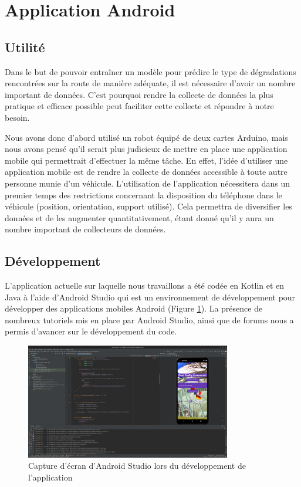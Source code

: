 \section{Application Android}

\subsection{Utilité}
Dans le but de pouvoir entraîner un modèle pour prédire le type de dégradations rencontrées sur la route de manière adéquate, il est nécessaire d'avoir un nombre important de données. C'est pourquoi rendre la collecte de données la plus pratique et efficace possible peut faciliter cette collecte et répondre à notre besoin.

Nous avons donc d'abord utilisé un robot équipé de deux cartes Arduino, mais nous avons pensé qu'il serait plus judicieux de mettre en place une application mobile qui permettrait d'effectuer la même tâche. En effet, l'idée d'utiliser une application mobile est de rendre la collecte de données accessible à toute autre personne munie d'un véhicule. L'utilisation de l'application nécessitera dans un premier temps des restrictions concernant la disposition du téléphone dans le véhicule (position, orientation, support utilisé). Cela permettra de diversifier les données et de les augmenter quantitativement, étant donné qu'il y aura un nombre important de collecteurs de données.

\subsection{Développement}
L'application actuelle sur laquelle nous travaillons a été codée en Kotlin et en Java à l'aide d'Android Studio qui est un environnement de développement pour développer des applications mobiles Android (Figure \ref{android_studio_2}). La présence de nombreux tutoriels mis en place par Android Studio, ainsi que de forums nous a permis d'avancer sur le développement du code.

\begin{figure}[htbp]
  \centering
  \includegraphics[width=0.8\textwidth]{img/android_studio_2.png}
  \caption{Capture d'écran d'Android Studio lors du développement de l'application}
  \label{android_studio_2}
\end{figure}

